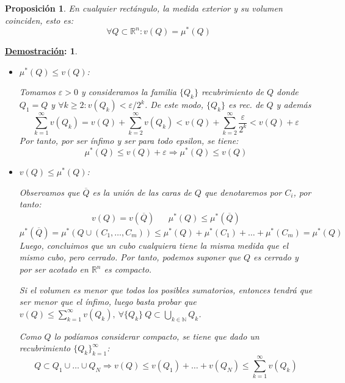 \documentclass[10pt,a4paper,openright]{book}
\theoremstyle{break}
\newtheorem*{prop}{Proposición}
\newtheorem*{demo}{\underline{Demostración}:}
\begin{document}
\begin{prop}
En cualquier rectángulo, la medida exterior y su volumen coinciden, esto es:
$$\forall Q \subset \mathbb{R}^n : v\left( Q \right) = \mu^{*}\left( Q \right)$$
\end{prop}
\begin{demo}
    \begin{itemize}
        \item $ \mu^*\left( Q \right) \le v\left( Q \right) $:
        
        Tomamos $\varepsilon > 0$ y consideramos la familia $ \{Q_k\}$ recubrimiento de $Q$ donde $Q_1 = Q$ y $\forall k \geq 2 : v(Q_k) < \varepsilon/2^{k}$. De este modo, $\{Q_k\} $ es rec. de $Q$ y además
$$\sum_{k=1}^{\infty} v\left( Q_k \right) = v\left( Q \right) + \sum_{k=2}^{\infty} v\left( Q_k \right) < v\left( Q \right) + \sum_{k=2}^{\infty} \frac{\varepsilon}{2^{k}} < v\left( Q \right) + \varepsilon$$
		Por tanto, por ser ínfimo y ser para todo epsilon, se tiene:
		$$\mu^*\left( Q \right) \le v\left( Q \right) + \varepsilon \Rightarrow \mu^*\left( Q \right) \le v\left( Q \right)$$
        \item $v\left( Q \right) \le \mu^*\left( Q \right)$:
        
        Observamos que $ \overline{Q}$ es la unión de las caras de $Q$ que denotaremos por $C_i$, por tanto:
        \begin{align*}
        v\left( Q \right) = v\left( \overline{Q} \right)  && \mu^{*}\left( Q \right) \le \mu^{*}\left( \overline{Q} \right)
        \end{align*}
        $$\mu^{*}\left( \overline{Q} \right) = \mu^{*}\left( Q \cup \left( C_1, \ldots, C_m \right)  \right) \le \mu^{*}\left( Q \right) + \mu^{*}\left( C_1 \right) + \ldots + \mu^{*}\left( C_m \right) = \mu^{*}\left( Q \right)$$
        Luego, concluimos que un cubo cualquiera tiene la misma medida que el mismo cubo, pero cerrado. Por tanto, podemos suponer que $Q$ es cerrado y por ser acotado en $\mathbb{R}^n$ es compacto. 
        
Si el volumen es menor que todos los posibles sumatorios, entonces tendrá que ser menor que el ínfimo, luego basta probar que $v\left( Q \right) \le \sum_{k=1}^{\infty} v\left( Q_k \right), \ \forall \{Q_k\} \ Q \subset \bigcup_{k \in \mathbb{N}} Q_k $.

Como $Q$ lo podíamos considerar compacto, se tiene que dado un recubrimiento $\{Q_k\}_{k=1}^{\infty}$:
$$Q \subset Q_1 \cup \ldots \cup Q_N \Rightarrow v\left( Q \right) \le v\left( Q_1 \right) +\ldots+v\left( Q_N \right) \le \sum_{k=1}^{\infty} v\left( Q_k \right)$$
\end{itemize}
\end{demo}
\end{document}
